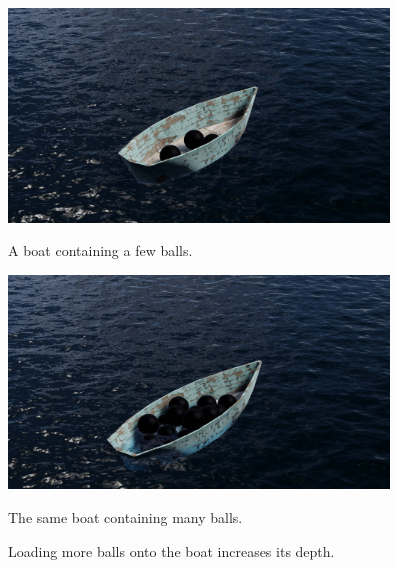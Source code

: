 \begin{figure}[H]
	\centering
	\begin{subcaptionblock}{0.46\textwidth}
		\centering
		\includegraphics[width=0.9\textwidth]{../Thesis/figures/light-boat.jpg}
		\caption{A boat containing a few balls.}
	\end{subcaptionblock}
	\begin{subcaptionblock}{0.46\textwidth}
		\centering
		\includegraphics[width=0.9\textwidth]{../Thesis/figures/heavy-boat.jpg}
		\caption{The same boat containing many balls.}
	\end{subcaptionblock}
	\caption{Loading more balls onto the boat increases its depth.}
	\label{fig:boat-sample}
\end{figure}


